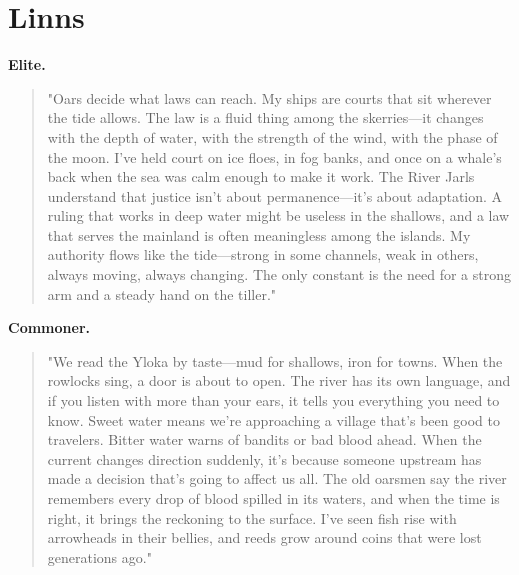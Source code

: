 \section*{Linns}
\textbf{Elite.}
\begin{quote}
"Oars decide what laws can reach. My ships are courts that sit wherever the tide allows. The law is a fluid thing among the skerries—it changes with the depth of water, with the strength of the wind, with the phase of the moon. I've held court on ice floes, in fog banks, and once on a whale's back when the sea was calm enough to make it work. The River Jarls understand that justice isn't about permanence—it's about adaptation. A ruling that works in deep water might be useless in the shallows, and a law that serves the mainland is often meaningless among the islands. My authority flows like the tide—strong in some channels, weak in others, always moving, always changing. The only constant is the need for a strong arm and a steady hand on the tiller."
\end{quote}
\textbf{Commoner.}
\begin{quote}
"We read the Yloka by taste—mud for shallows, iron for towns. When the rowlocks sing, a door is about to open. The river has its own language, and if you listen with more than your ears, it tells you everything you need to know. Sweet water means we're approaching a village that's been good to travelers. Bitter water warns of bandits or bad blood ahead. When the current changes direction suddenly, it's because someone upstream has made a decision that's going to affect us all. The old oarsmen say the river remembers every drop of blood spilled in its waters, and when the time is right, it brings the reckoning to the surface. I've seen fish rise with arrowheads in their bellies, and reeds grow around coins that were lost generations ago."
\end{quote}

